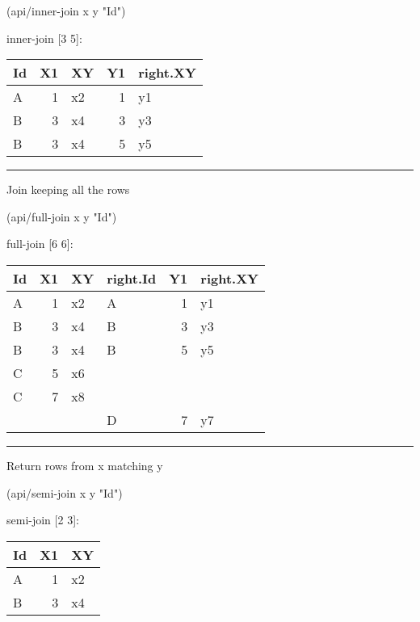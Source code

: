 \documentclass[]{article}
\newenvironment{Shaded}{\begin{snugshade}}{\end{snugshade}}
\newcommand{\StringTok}[1]{\textcolor[rgb]{0.31,0.60,0.02}{#1}}
\newcommand{\NormalTok}[1]{#1}
\begin{document}
\begin{Shaded}
\begin{Highlighting}[]
\NormalTok{(api/inner-join x y }\StringTok{"Id"}\NormalTok{)}
\end{Highlighting}
\end{Shaded}

inner-join {[}3 5{]}:

\begin{longtable}[]{@{}lrlrl@{}}
\toprule
Id & X1 & XY & Y1 & right.XY\tabularnewline
\midrule
\endhead
A & 1 & x2 & 1 & y1\tabularnewline
B & 3 & x4 & 3 & y3\tabularnewline
B & 3 & x4 & 5 & y5\tabularnewline
\bottomrule
\end{longtable}

\begin{center}\rule{0.5\linewidth}{0.5pt}\end{center}

Join keeping all the rows

\begin{Shaded}
\begin{Highlighting}[]
\NormalTok{(api/full-join x y }\StringTok{"Id"}\NormalTok{)}
\end{Highlighting}
\end{Shaded}

full-join {[}6 6{]}:

\begin{longtable}[]{@{}lrllrl@{}}
\toprule
Id & X1 & XY & right.Id & Y1 & right.XY\tabularnewline
\midrule
\endhead
A & 1 & x2 & A & 1 & y1\tabularnewline
B & 3 & x4 & B & 3 & y3\tabularnewline
B & 3 & x4 & B & 5 & y5\tabularnewline
C & 5 & x6 & & &\tabularnewline
C & 7 & x8 & & &\tabularnewline
& & & D & 7 & y7\tabularnewline
\bottomrule
\end{longtable}

\begin{center}\rule{0.5\linewidth}{0.5pt}\end{center}

Return rows from x matching y

\begin{Shaded}
\begin{Highlighting}[]
\NormalTok{(api/semi-join x y }\StringTok{"Id"}\NormalTok{)}
\end{Highlighting}
\end{Shaded}

semi-join {[}2 3{]}:

\begin{longtable}[]{@{}lrl@{}}
\toprule
Id & X1 & XY\tabularnewline
\midrule
\endhead
A & 1 & x2\tabularnewline
B & 3 & x4\tabularnewline
\bottomrule
\end{longtable}
\end{document}
